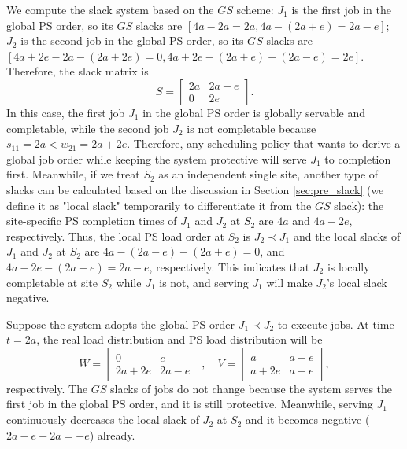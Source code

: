 We compute the slack system based on the $GS$ scheme: $J_1$ is the first job in the global PS order, so its $GS$ slacks are $[4a - 2a=2a, 4a-(2a+e)=2a-e]$; $J_2$ is the second job in the global PS order, so its $GS$ slacks are $[4a+2e-2a - (2a+2e) =0, 4a+2e-(2a+e)-(2a-e)=2e]$. Therefore, the slack matrix is
\begin{equation}
    S = \begin{bmatrix} 2a & 2a-e \\ 0 & 2e \end{bmatrix}.
\end{equation}
In this case, the first job $J_1$ in the global PS order is globally servable and completable, while the second job $J_2$ is not completable because $s_{11} = 2a < w_{21} = 2a+2e$. Therefore, any scheduling policy that wants to derive a global job order while keeping the system protective will serve $J_1$ to completion first. Meanwhile, if we treat $S_2$ as an independent single site, another type of slacks can be calculated based on the discussion in Section \ref{sec:pre_slack} (we define it as "local slack" temporarily to differentiate it from the $GS$ slack): the site-specific PS completion times of $J_1$ and $J_2$ at $S_2$ are $4a$ and $4a-2e$, respectively. Thus, the local PS load order at $S_2$ is $J_2 \prec J_1$ and the local slacks of $J_1$ and $J_2$ at $S_2$ are $4a-(2a-e)-(2a+e)=0$, and $4a-2e-(2a-e)=2a-e$, respectively. This indicates that $J_2$ is locally completable at site $S_2$ while $J_1$ is not, and serving $J_1$ will make $J_2$'s local slack negative.

Suppose the system adopts the global PS order $J_1 \prec J_2$ to execute jobs. At time $t=2a$, the real load distribution and PS load distribution will be
\begin{equation}
    W = \begin{bmatrix} 0 & e \\ 2a+2e & 2a-e \end{bmatrix}, \quad V = \begin{bmatrix} a & a+e \\ a+2e & a-e \end{bmatrix},
\end{equation}
respectively. The $GS$ slacks of jobs do not change because the system serves the first job in the global PS order, and it is still protective. Meanwhile, serving $J_1$ continuously decreases the local slack of $J_2$ at $S_2$ and it becomes negative ($2a-e-2a=-e$) already.

